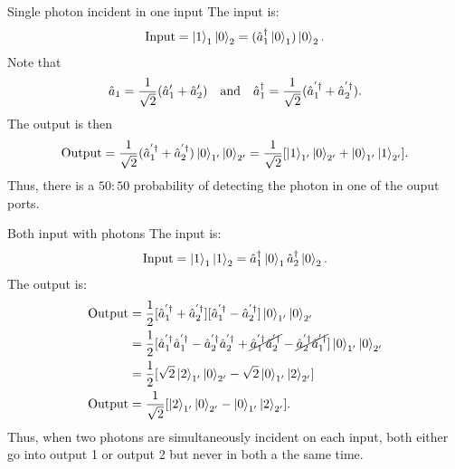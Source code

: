 \begin{example}{Single photon incident in one input}
    The input is:
    \begin{align*}
        \text{Input}=\left|1\right\rangle_1\left|0\right\rangle_2=(\hat{a}^\dagger_1\left|0\right\rangle_1)\left|0\right\rangle_2.
    \end{align*}
    Note that 
    \begin{align*}
        \hat{a}_1=\frac{1}{\sqrt{2}}(\hat{a}_1'+\hat{a}_2')\quad\text{and}\quad\hat{a}_1^\dagger=\frac{1}{\sqrt{2}}(\hat{a}_1^{'\dagger}+\hat{a}_2^{'\dagger}).
    \end{align*}
    The output is then 
    \begin{align*}
        \text{Output}=\frac{1}{\sqrt{2}}(\hat{a}_1^{'\dagger}+\hat{a}_2^{'\dagger})\left|0\right\rangle_{1'}\left|0\right\rangle_{2'}=\frac{1}{\sqrt{2}}[\left|1\right\rangle_{1'}\left|0\right\rangle_{2'}+\left|0\right\rangle_{1'}\left|1\right\rangle_{2'}].
    \end{align*}
    Thus, there is a $50:50$ probability of detecting the photon in one of the ouput ports.
\end{example}
\begin{example}{Both input with photons}
    The input is:
    \begin{align*}
        \text{Input}=\left|1\right\rangle_1\left|1\right\rangle_2=\hat{a}_1^\dagger\left|0\right\rangle_1\hat{a}_2^\dagger\left|0\right\rangle_2.
    \end{align*}
    The output is:
    \begin{align*}
        \text{Output}&=\frac{1}{2}[\hat{a}_1^{'\dagger}+\hat{a}_2^{'\dagger}][\hat{a}_1^{'\dagger}-\hat{a}_2^{'\dagger}]\left|0\right\rangle_{1'}\left|0\right\rangle_{2'}\\
        &=\frac{1}{2}[\hat{a}_1^{'\dagger}\hat{a}_1^{'\dagger}-\hat{a}_2^{'\dagger}\hat{a}_2^{'\dagger}+\cancel{\hat{a}_1^{'\dagger}\hat{a}_2^{'\dagger}}-\cancel{\hat{a}_2^{'\dagger}\hat{a}_1^{'\dagger}}]\left|0\right\rangle_{1'}\left|0\right\rangle_{2'}\\
        &=\frac{1}{2}[\sqrt{2}\left|2\right\rangle_{1'}\left|0\right\rangle_{2'}-\sqrt{2}\left|0\right\rangle_{1'}\left|2\right\rangle_{2'}]\\
        \text{Output}&=\frac{1}{\sqrt{2}}[\left|2\right\rangle_{1'}\left|0\right\rangle_{2'}-\left|0\right\rangle_{1'}\left|2\right\rangle_{2'}].
    \end{align*}
    Thus, when two photons are simultaneously incident on each input, both either go into output 1 or output 2 but never in both a the same time.
\end{example}



